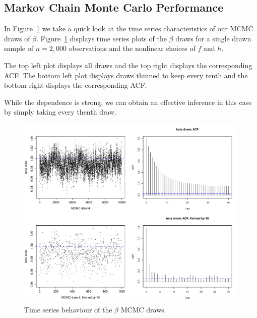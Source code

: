 \subsection{Markov Chain Monte Carlo Performance}\label{subsec:sim-mcmc}

In Figure~\ref{fig:mcmc} we take a quick look at the time series characteristics of our
MCMC draws of $\beta$.
Figure~\ref{fig:mcmc} displays time series plots of the $\beta$ draws for a single drawn
sample of $n = 2,000$ observations and the nonlinear choices of $f$ and $h$.

The top left plot displays all draws and the top right displays the corresponding ACF.
The bottom left plot displays draws thinned to keep every tenth and the bottom right displays the corresponding ACF.

While the dependence is strong, we can obtain an effective inference in this case by simply taking
every thenth draw.

\begin{figure}
\includegraphics[scale=.6]{14-11_1-2_2000_MCMC.pdf}
\caption{%
Time series behaviour of the $\beta$ MCMC draws.
}\label{fig:mcmc}
\end{figure}
